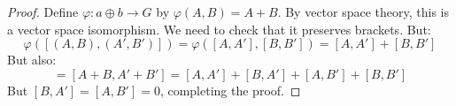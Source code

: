 \documentclass[crop=false,class=book,oneside]{standalone}                      %
\begin{document}
        \begin{proof}
            Define $\varphi:a\oplus{b}\rightarrow{G}$ by
            $\varphi(A,B)=A+B$. By vector space theory, this is a vector
            space isomorphism. We need to check that it preserves brackets.
            But:
            \begin{equation}
                \varphi([(A,B),(A',B')])=\varphi([A,A'],[B,B'])
                =[A,A']+[B,B']
            \end{equation}
            But also:
            \begin{equation}
                [\varphi(A,B),\varphi(A',B')]=[A+B,A'+B']
                =[A,A']+[B,A']+[A,B']+[B,B']
            \end{equation}
            But $[B,A']=[A,B']=0$, completing the proof.
        \end{proof}
\end{document}
